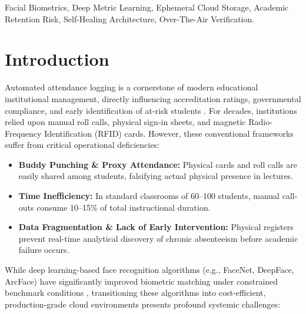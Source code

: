 \documentclass[conference]{IEEEtran}
\begin{document}
\begin{IEEEkeywords}
Facial Biometrics, Deep Metric Learning, Ephemeral Cloud Storage, Academic Retention Risk, Self-Healing Architecture, Over-The-Air Verification.
\end{IEEEkeywords}

\section{Introduction}
Automated attendance logging is a cornerstone of modern educational institutional management, directly influencing accreditation ratings, governmental compliance, and early identification of at-risk students \cite{jain2004biometrics}. For decades, institutions relied upon manual roll calls, physical sign-in sheets, and magnetic Radio-Frequency Identification (RFID) cards. However, these conventional frameworks suffer from critical operational deficiencies:
\begin{itemize}
    \item \textbf{Buddy Punching \& Proxy Attendance:} Physical cards and roll calls are easily shared among students, falsifying actual physical presence in lectures.
    \item \textbf{Time Inefficiency:} In standard classrooms of 60--100 students, manual call-outs consume 10--15\% of total instructional duration.
    \item \textbf{Data Fragmentation \& Lack of Early Intervention:} Physical registers prevent real-time analytical discovery of chronic absenteeism before academic failure occurs.
\end{itemize}

While deep learning-based face recognition algorithms (e.g., FaceNet, DeepFace, ArcFace) have significantly improved biometric matching under constrained benchmark conditions \cite{schroff2015facenet, deng2019arcface}, transitioning these algorithms into cost-efficient, production-grade cloud environments presents profound systemic challenges:
\end{document}
